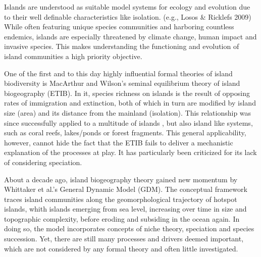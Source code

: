 \documentclass[a4paper]{scrartcl}
\begin{document}



Islands are understood as suitable model systems for ecology and evolution due to their well definable characteristics like isolation. (e.g., Losos \& Ricklefs 2009) %
While often featuring unique species communities and harboring countless endemics, %
islands are especially threatened by climate change, human impact and invasive species. %
This makes understanding the functioning and evolution of island communities a high priority objective.

One of the first and to this day highly influential formal theories of island biodiversity is MacArthur and Wilson's seminal equilibrium theory of island biogeography (ETIB). %
In it, species richness on islands is the result of opposing rates of immigration and extinction, both of which in turn are modified by island size (area) and its distance from the mainland (isolation).
This relationship was since successfully applied to a multitude of islands %
, but also island like systems, such as coral reefs, lakes/ponds or forest fragments. %
This general applicability, however, cannot hide the fact that the ETIB fails to deliver a mechanistic explanation of the processes at play.
It has particularly been criticized for its lack of considering speciation. %

About a decade ago, island biogeography theory gained new momentum by Whittaker et al.'s General Dynamic Model (GDM). %
The conceptual framework traces island communities along the geomorphological trajectory of hotspot islands,
whith islands emerging from sea level, increasing over time in size and topographic complexity, before eroding and subsiding in the ocean again.
In doing so, the model incorporates concepts of niche theory, speciation and species succession.
Yet, there are still many processes and drivers deemed important, which are not considered by any formal theory and often little investigated.
\end{document}
